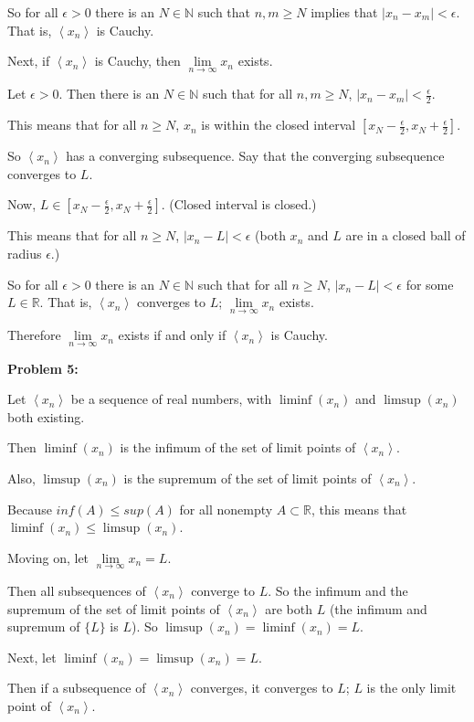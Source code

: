 \documentclass[a4paper,12pt]{article}
\newcommand{\tab}{\hspace{4mm}} %
\newcommand{\shunt}{\vspace{20mm}}
\newcommand{\absval}[1]{\lvert #1 \rvert}
\newcommand{\anbrack}[1]{\left\langle #1 \right\rangle}
\newcommand{\ep}{\epsilon}
\newcommand{\N}{\mathbb{N}}
\newcommand{\R}{\mathbb{R}}
\begin{document}
\tab So for all $\ep >0$ there is an $N \in \N$ such that $n,m \geq N$ implies that $\absval{x_n - x_m} < \ep$. That is, $\anbrack{x_n}$ is Cauchy.

Next, if $\anbrack{x_n}$ is Cauchy, then $\lim\limits_{n \to \infty} x_n$ exists.

\tab Let $\ep >0$. Then there is an $N \in \N$ such that for all $n,m \geq N$, $\absval{x_n - x_m} < \frac{\ep}{2}$.

\tab This means that for all $n \geq N$, $x_n$ is within the closed interval $[x_N - \frac{\ep}{2}, x_N +\frac{\ep}{2}]$.

\tab So $\anbrack{x_n}$ has a converging subsequence. Say that the converging subsequence converges to $L$.

\tab Now, $L \in [x_N - \frac{\ep}{2}, x_N +\frac{\ep}{2}]$. (Closed interval is closed.)

\tab This means that for all $n \geq N$, $\absval{x_n - L} < \ep$ (both $x_n$ and $L$ are in a closed ball of radius $\ep$.)

\tab So for all $\ep >0$ there is an $N \in \N$ such that for all $n \geq N$, $\absval{x_n - L} < \ep$ for some $L \in \R$. That is, $\anbrack{x_n}$ converges to $L$; $\lim\limits_{n \to \infty} x_n$ exists.

Therefore $\lim\limits_{n \to \infty} x_n$ exists if and only if $\anbrack{x_n}$ is Cauchy.

\shunt

{\bf Problem 5:}

Let $\anbrack{x_n}$ be a sequence of real numbers, with $\liminf(x_n)$ and $\limsup(x_n)$ both existing.

Then $\liminf(x_n)$ is the infimum of the set of limit points of $\anbrack{x_n}$.

Also, $\limsup(x_n)$ is the supremum of the set of limit points of $\anbrack{x_n}$.

Because $inf(A) \leq sup(A)$ for all nonempty $A \subset \R$, this means that $\liminf(x_n) \leq \limsup(x_n)$.

Moving on, let $\lim\limits_{n \to \infty} x_n = L$.

\tab Then all subsequences of $\anbrack{x_n}$ converge to $L$. So the infimum and the supremum of the set of limit points of $\anbrack{x_n}$ are both $L$ (the infimum and supremum of $\{L\}$ is $L$). So $\limsup(x_n) = \liminf(x_n) = L$.

Next, let $\liminf(x_n) = \limsup(x_n) = L$.

\tab Then if a subsequence of $\anbrack{x_n}$ converges, it converges to $L$; $L$ is the only limit point of $\anbrack{x_n}$.
\end{document}

